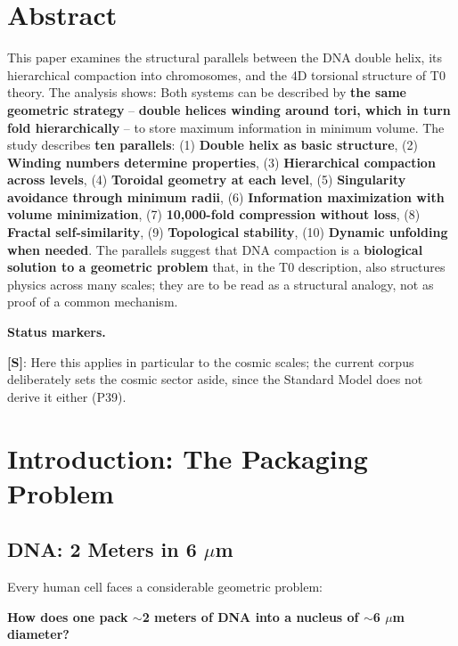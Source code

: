 \section*{Abstract}
		This paper examines the structural parallels between the DNA double helix, its hierarchical compaction into chromosomes, and the 4D torsional structure of T0 theory. The analysis shows: Both systems can be described by \textbf{the same geometric strategy} -- \textbf{double helices winding around tori, which in turn fold hierarchically} -- to store maximum information in minimum volume. The study describes \textbf{ten parallels}: (1) \textbf{Double helix as basic structure}, (2) \textbf{Winding numbers determine properties}, (3) \textbf{Hierarchical compaction across levels}, (4) \textbf{Toroidal geometry at each level}, (5) \textbf{Singularity avoidance through minimum radii}, (6) \textbf{Information maximization with volume minimization}, (7) \textbf{10,000-fold compression without loss}, (8) \textbf{Fractal self-similarity}, (9) \textbf{Topological stability}, (10) \textbf{Dynamic unfolding when needed}. The parallels suggest that DNA compaction is a \textbf{biological solution to a geometric problem} that, in the T0 description, also structures physics across many scales; they are to be read as a structural analogy, not as proof of a common mechanism.

	\medskip\noindent\textbf{Status markers.}
	

	\noindent \textbf{[S]}: Here this applies in particular to the cosmic scales; the current corpus deliberately sets the cosmic sector aside, since the Standard Model does not derive it either (P39).




	\section{Introduction: The Packaging Problem}

	\subsection{DNA: 2 Meters in 6 $\mu$m}

	Every human cell faces a considerable geometric problem:

	\begin{center}

		\textbf{How does one pack $\sim$2 meters of DNA into a nucleus of $\sim$6 $\mu$m diameter?}
	\end{center}

